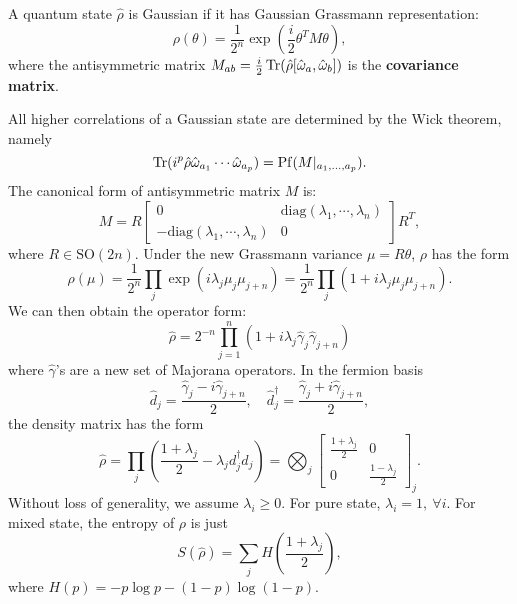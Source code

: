 \documentclass{SciPost}
\begin{document}
\begin{definition}
A quantum state $\hat \rho$ is Gaussian if it has Gaussian Grassmann representation:
\begin{equation}
	\rho(\theta)=\frac{1}{2^{n}}\exp\left(\frac{i}{2}\theta^{T}M\theta\right),
\end{equation}
where the antisymmetric matrix $M_{ab}=\frac{i}{2}\operatorname{Tr}(\hat \rho[\hat \omega_a,\hat\omega_b])$ is the \textbf{covariance matrix}.
\end{definition}
All higher correlations of a Gaussian state are determined by the Wick theorem, namely
$$
\operatorname{Tr}(i^p\hat\rho\hat\omega_{a_1}\cdots\hat\omega_{a_p})=\operatorname{Pf}(M|_{a_1,\dots,a_p}).
$$
The canonical form of antisymmetric matrix $M$ is:
\begin{equation}
	M = R \begin{bmatrix}
	0 & \mathrm{diag}(\lambda_1,\cdots,\lambda_n) \\ 
	-\mathrm{diag}(\lambda_1,\cdots,\lambda_n) & 0
\end{bmatrix} R^T,
\end{equation}
where $R \in \mathrm{SO}(2n)$.
Under the new Grassmann variance $\mu = R\theta$, $\rho$ has the form
\begin{equation}
	\rho(\mu)
	=\frac{1}{2^{n}}\prod_{j}\exp\left(i\lambda_j\mu_{j} \mu_{j+n}\right)
	=\frac{1}{2^{n}}\prod_{j}\left(1+i\lambda_{j} \mu_{j} \mu_{j+n}\right).
\end{equation}
We can then obtain the operator form: 
\begin{equation}
	\hat\rho = 2^{-n} \prod_{j=1}^n(1+i\lambda_j \hat\gamma_j\hat\gamma_{j+n})
\end{equation}
where $\hat \gamma$'s are a new set of Majorana operators. In the fermion basis
\begin{equation}
	\hat d_j = \frac{\hat\gamma_j - i \hat\gamma_{j+n}}{2},\quad
	\hat d_j^\dagger = \frac{\hat\gamma_j + i \hat\gamma_{j+n}}{2},
\end{equation}
the density matrix has the form
\begin{equation}\label{eq:gaussian-std-form}
	\hat\rho
	= \prod_{j}\left(\frac{1+\lambda_j}{2}-\lambda_{j}d_{j}^{\dagger}d_{j}\right) 
	=\bigotimes_j \begin{bmatrix}
		\frac{1+\lambda_j}{2} & 0 \\
		0 & \frac{1-\lambda_j}{2}
	\end{bmatrix}_j.
\end{equation}
Without loss of generality, we assume $\lambda_i \ge 0$. For pure state, $\lambda_i =1,\ \forall i$.
For mixed state, the entropy of $\rho$ is just 
\begin{equation}
	S(\hat\rho)=\sum_j H\left(\frac{1+\lambda_j}{2}\right),
\end{equation}
where $H(p) = -p \log p - (1-p) \log(1-p)$.
\end{document}
